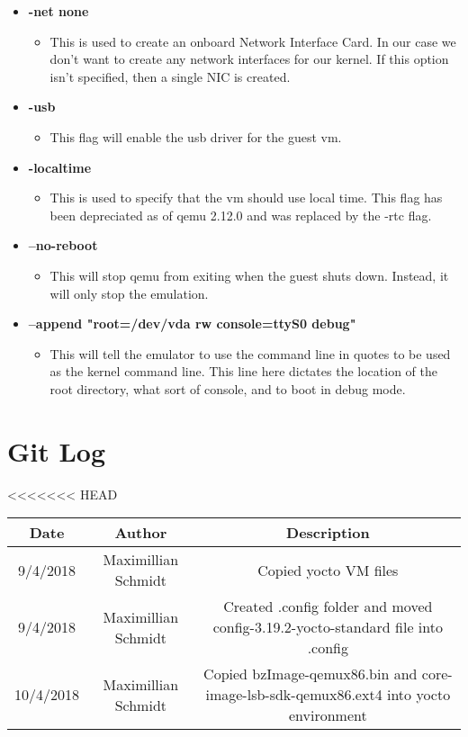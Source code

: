\documentclass[10pt,onecolumn,draftclsnofoot]{IEEEtran} %
\begin{document}
\begin{singlespace}
\begin{itemize}
    \item \textbf{-net none}
    \begin{itemize}
      \item This is used to create an onboard Network Interface Card. In our case we don’t want to create any network interfaces for our kernel. If this option isn’t specified, then a single NIC is created.
    \end{itemize}

    \item \textbf{-usb}
    \begin{itemize}
      \item This flag will enable the usb driver for the guest vm.
    \end{itemize}

    \item \textbf{-localtime }
    \begin{itemize}
      \item This is used to specify that the vm should use local time. This flag has been depreciated as of qemu 2.12.0 and was replaced by the -rtc flag.
    \end{itemize}

    \item \textbf{--no-reboot}
    \begin{itemize}
      \item This will stop qemu from exiting when the guest shuts down. Instead, it will only stop the emulation.
    \end{itemize}

    \item \textbf{--append "root=/dev/vda rw console=ttyS0 debug"}
    \begin{itemize}
      \item This will tell the emulator to use the command line in quotes to be used as the kernel command line. This line here dictates the location of the root directory, what sort of console, and to boot in debug mode.
    \end{itemize}

  \end{itemize}


\section{\bf Git Log}
 	\begin{center}
<<<<<<< HEAD
 \begin{tabular}{||c c c||} 
 \hline
 Date & Author & Description \\
 \hline
 9/4/2018 & Maximillian Schmidt & Copied yocto VM files \\ 
 \hline
 9/4/2018 & Maximillian Schmidt & Created .config folder and moved config-3.19.2-yocto-standard file into .config \\
 \hline
 10/4/2018 & Maximillian Schmidt & Copied bzImage-qemux86.bin and core-image-lsb-sdk-qemux86.ext4 into yocto environment \\
 \hline
\end{tabular}
	\end{center}


\end{singlespace}
\end{document}
